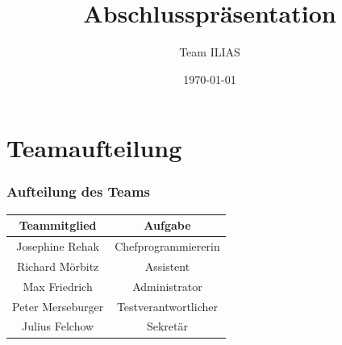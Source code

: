 \documentclass{beamer}
\title{Abschlusspräsentation}
\author{Team ILIAS}
\date{\today}
\begin{document}
	\maketitle
	\frame{\tableofcontents[]}
	\section{Teamaufteilung}
	\begin{frame}
		\frametitle{Aufteilung des Teams}
		\begin{center}
			\begin{tabular}{c|c}
				Teammitglied & Aufgabe \\\hline
				Josephine Rehak & Chefprogrammiererin\\
				Richard Mörbitz & Assistent\\
				Max Friedrich & Administrator\\
				Peter Merseburger & Testverantwortlicher\\
				Julius Felchow & Sekretär\\
			\end{tabular}
		\end{center}
	\end{frame}
 
\end{document}
